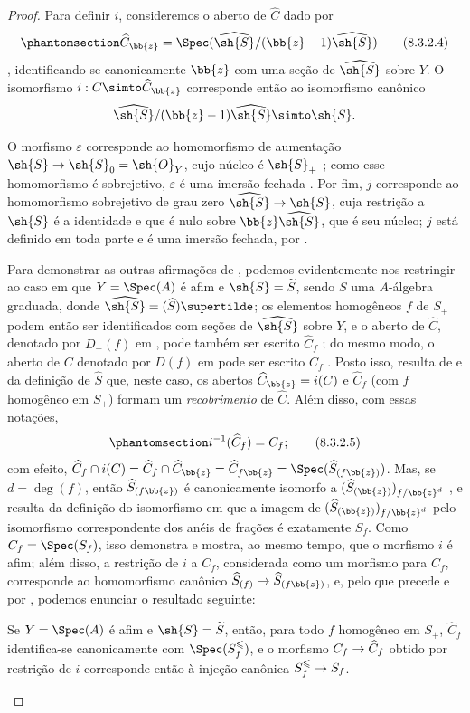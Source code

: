 \documentclass[oneside,10pt]{amsart}
\makeatletter
\renewcommand{\leq}{\leqslant}
\newcommand{\ega@arrow}[2]{\mathchoice{#1}{#2}{#2}{#2}}
\renewcommand{\to}{\ega@arrow{\longrightarrow}{\rightarrow}}
\let\EGAOriginalLabel\label
\renewcommand{\label}[1]{\phantomsection\EGAOriginalLabel{#1}}
\makeatother
\begin{document}
\begin{proof}
Para definir $i$, consideremos o aberto de $\widehat{C}$ dado por
\[
\label{II.8.3.2.4}
  \widehat{C}_{\bb{z}} = \Spec(\widehat{\sh{S}}/(\bb{z}-1)\widehat{\sh{S}})
\tag{8.3.2.4}
\]
, identificando-se canonicamente $\bb{z}$ com uma seção de $\widehat{\sh{S}}$ sobre $Y$.
O isomorfismo $i: C\simto\widehat{C}_{\bb{z}}$ corresponde então ao isomorfismo canônico 
\[
  \widehat{\sh{S}}/(\bb{z}-1)\widehat{\sh{S}} \simto \sh{S}.
\]

O morfismo $\varepsilon$ corresponde ao homomorfismo de aumentação $\sh{S}\to\sh{S}_0=\sh{O}_Y$, cujo núcleo é $\sh{S}_+$ ; como esse homomorfismo é sobrejetivo, $\varepsilon$ é uma imersão fechada .
Por fim, $j$ corresponde  ao homomorfismo sobrejetivo de grau zero $\widehat{\sh{S}}\to\sh{S}$, cuja restrição a $\sh{S}$ é a identidade e que é nulo sobre $\bb{z}\widehat{\sh{S}}$, que é seu núcleo;
$j$ está definido em toda parte e é uma imersão fechada, por .

Para demonstrar as outras afirmações de , podemos evidentemente nos restringir ao caso em que $Y=\Spec(A)$ é afim e $\sh{S}=\widetilde{S}$, sendo $S$ uma $A$-álgebra graduada, donde $\widehat{\sh{S}}=(\widehat{S})\supertilde$;
os elementos homogêneos $f$ de $S_+$ podem então ser identificados com seções de $\widehat{\sh{S}}$ sobre $Y$, e o aberto de $\widehat{C}$, denotado por $D_+(f)$ em , pode também ser escrito $\widehat{C}_f$ ;
do mesmo modo, o aberto de $C$ denotado por $D(f)$ em  pode ser escrito $C_f$ .
Posto isso, resulta de  e da definição de $\widehat{S}$ que, neste caso, os abertos $\widehat{C}_{\bb{z}}=i(C)$ e $\widehat{C}_f$ (com $f$ homogêneo em $S_+$) formam um \emph{recobrimento} de $\widehat{C}$.
Além disso, com essas notações,
\[
\label{II.8.3.2.5}
  i^{-1}(\widehat{C}_f) = C_f;
\tag{8.3.2.5}
\]
com efeito, $\widehat{C}_f\cap i(C) = \widehat{C}_f\cap\widehat{C}_{\bb{z}} = \widehat{C}_{f\bb{z}} = \Spec(\widehat{S}_{(f\bb{z})})$.
Mas, se $d=\deg(f)$, então $\widehat{S}_{(f\bb{z})}$ é canonicamente isomorfo a $(\widehat{S}_{(\bb{z})})_{f/\bb{z}^d}$ , e resulta da definição do isomorfismo em  que a imagem de $(\widehat{S}_{(\bb{z})})_{f/\bb{z}^d}$ pelo isomorfismo correspondente dos anéis de frações é exatamente $S_f$.
Como $C_f=\Spec(S_f)$, isso demonstra  e mostra, ao mesmo tempo, que o morfismo $i$ é afim;
além disso, a restrição de $i$ a $C_f$, considerada como um morfismo para $\widehat{C}_f$, corresponde  ao homomorfismo canônico $\widehat{S}_{(f)}\to\widehat{S}_{(f\bb{z})}$, e, pelo que precede e por , podemos enunciar o resultado seguinte:
\begin{env}[8.3.2.6]
\label{II.8.3.2.6}
Se $Y=\Spec(A)$ é afim e $\sh{S}=\widetilde{S}$, então, para todo $f$ homogêneo em $S_+$, $\widehat{C}_f$ identifica-se canonicamente com $\Spec(S_f^\leq)$, e o morfismo $C_f\to\widehat{C}_f$ obtido por restrição de $i$ corresponde então à injeção canônica $S_f^\leq\to S_f$.
\end{env}


\end{proof}
\end{document}
